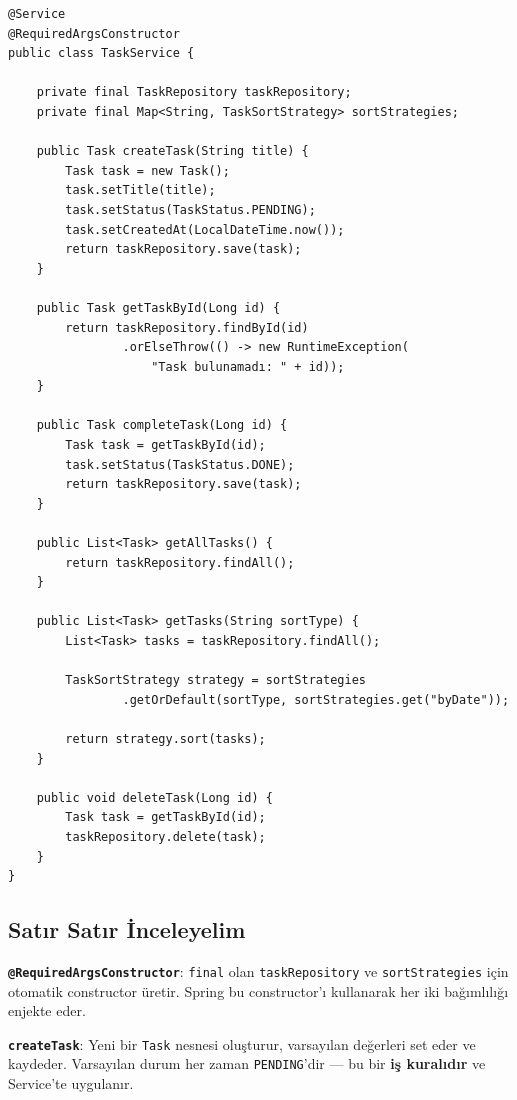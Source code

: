 \documentclass[11pt,a4paper]{article}
\begin{document}
\begin{lstlisting}[style=java]
@Service
@RequiredArgsConstructor
public class TaskService {

    private final TaskRepository taskRepository;
    private final Map<String, TaskSortStrategy> sortStrategies;

    public Task createTask(String title) {
        Task task = new Task();
        task.setTitle(title);
        task.setStatus(TaskStatus.PENDING);
        task.setCreatedAt(LocalDateTime.now());
        return taskRepository.save(task);
    }

    public Task getTaskById(Long id) {
        return taskRepository.findById(id)
                .orElseThrow(() -> new RuntimeException(
                    "Task bulunamadı: " + id));
    }

    public Task completeTask(Long id) {
        Task task = getTaskById(id);
        task.setStatus(TaskStatus.DONE);
        return taskRepository.save(task);
    }

    public List<Task> getAllTasks() {
        return taskRepository.findAll();
    }

    public List<Task> getTasks(String sortType) {
        List<Task> tasks = taskRepository.findAll();

        TaskSortStrategy strategy = sortStrategies
                .getOrDefault(sortType, sortStrategies.get("byDate"));

        return strategy.sort(tasks);
    }

    public void deleteTask(Long id) {
        Task task = getTaskById(id);
        taskRepository.delete(task);
    }
}
\end{lstlisting}

\subsection*{Sat{\i}r Sat{\i}r \.{I}nceleyelim}

\textbf{\texttt{@RequiredArgsConstructor}}: \texttt{final} olan \texttt{taskRepository} ve \texttt{sortStrategies} i\c{c}in otomatik constructor \"{u}retir. Spring bu constructor'{\i} kullanarak her iki ba\u{g}{\i}ml{\i}l{\i}\u{g}{\i} enjekte eder.

\textbf{\texttt{createTask}}: Yeni bir \texttt{Task} nesnesi olu\c{s}turur, varsay{\i}lan de\u{g}erleri set eder ve kaydeder. Varsay{\i}lan durum her zaman \texttt{PENDING}'dir --- bu bir \textbf{i\c{s} kural{\i}d{\i}r} ve Service'te uygulan{\i}r.
\end{document}
